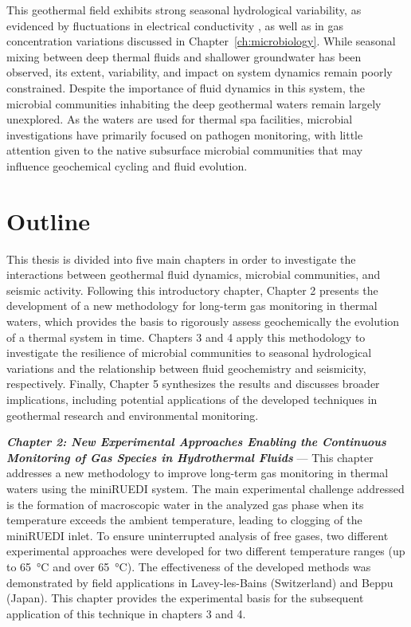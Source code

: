 This geothermal field exhibits strong seasonal hydrological variability, as evidenced by fluctuations in electrical conductivity \citep{sonney2009numerical}, as well as in gas concentration variations discussed in Chapter~\ref{ch:microbiology}.
While seasonal mixing between deep thermal fluids and shallower groundwater has been observed, its extent, variability, and impact on system dynamics remain poorly constrained.
Despite the importance of fluid dynamics in this system, the microbial communities inhabiting the deep geothermal waters remain largely unexplored.
As the waters are used for thermal spa facilities, microbial investigations have primarily focused on pathogen monitoring, with little attention given to the native subsurface microbial communities that may influence geochemical cycling and fluid evolution.


\section{Outline}
This thesis is divided into five main chapters in order to investigate the interactions between geothermal fluid dynamics, microbial communities, and seismic activity.
Following this introductory chapter, Chapter 2 presents the development of a new methodology for long-term gas monitoring in thermal waters, which provides the basis to rigorously assess geochemically the evolution of a thermal system in time.
Chapters 3 and 4 apply this methodology to investigate the resilience of microbial communities to seasonal hydrological variations and the relationship between fluid geochemistry and seismicity, respectively.
Finally, Chapter 5 synthesizes the results and discusses broader implications, including potential applications of the developed techniques in geothermal research and environmental monitoring.\vspace{10pt}

\textbf{\textit{Chapter 2: New Experimental Approaches Enabling the Continuous Monitoring of Gas Species in Hydrothermal Fluids}} --- This chapter addresses a new methodology to improve long-term gas monitoring in thermal waters using the miniRUEDI system.
The main experimental challenge addressed is the formation of macroscopic water in the analyzed gas phase when its temperature exceeds the ambient temperature, leading to clogging of the miniRUEDI inlet.
To ensure uninterrupted analysis of free gases, two different experimental approaches were developed for two different temperature ranges (up to \SI{65}{\celsius} and over \SI{65}{\celsius}).
The effectiveness of the developed methods was demonstrated by field applications in Lavey-les-Bains (Switzerland) and Beppu (Japan).
This chapter provides the experimental basis for the subsequent application of this technique in chapters 3 and 4.\vspace{10pt}

